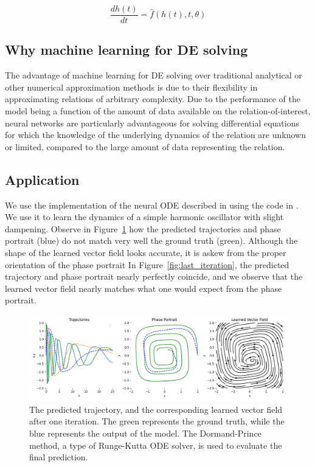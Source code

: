 \documentclass[11pt]{article}
\begin{document}
$$
\frac{dh(t)}{dt} = \hat f(h(t), t, \theta)
$$

\subsection{Why machine learning for DE solving}

The advantage of machine learning for DE solving over traditional analytical or other numerical approximation methods is due to their flexibility in approximating relations of arbitrary complexity. Due to the performance of the model being a function of the amount of data available on the relation-of-interest, neural networks are particularly advantageous for solving differential equations for which the knowledge of the underlying dynamics of the relation are unknown or limited, compared to the large amount of data representing the relation.

\subsection{Application}

We use the implementation of the neural ODE described in \cite{chen2018neuralode} using the code in \cite{torchdiffeq}. We use it to learn the dynamics of a simple harmonic oscillator with slight dampening. Observe in Figure~\ref{fig:first_iteration} how the predicted trajectories and phase portrait (blue) do not match very well the ground truth (green). Although the shape of the learned vector field looks accurate, it is askew from the proper orientation of the phase portrait In Figure~\ref{fig:last_iteration}, the predicted trajectory and phase portrait nearly perfectly coincide, and we observe that the learned vector field nearly matches what one would expect from the phase portrait.


\begin{figure}
  \centering
  \includegraphics*[width=\linewidth]{000.png}
  \caption{The predicted trajectory, and the corresponding learned vector field after one iteration. The green represents the ground truth, while the blue represents the output of the model. The Dormand-Prince method, a type of Runge-Kutta ODE solver, is used to evaluate the final prediction.}
  \label{fig:first_iteration}
\end{figure}
\end{document}
